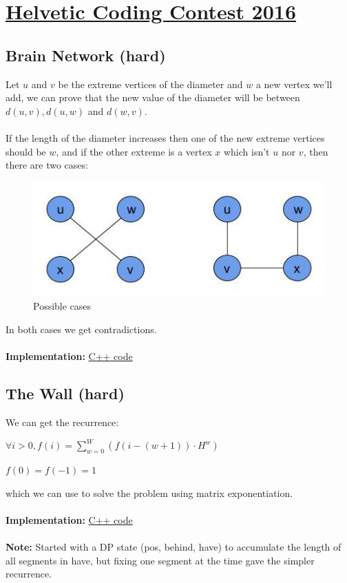 \documentclass[a4paper,12pt]{article}
\begin{document}
\section{\href{http://codeforces.com/contest/690}{Helvetic Coding Contest 2016}}

\subsection{Brain Network (hard)}

Let $u$ and $v$ be the extreme vertices of the diameter and $w$ a new vertex we'll add,
we can prove that the new value of the diameter will be between $d(u,v), d(u,w)$ and $d(w,v)$.
\\ \\
If the length of the diameter increases then one of the new extreme vertices should be $w$,
and if the other extreme is a vertex $x$ which isn't $u$ nor $v$, then there
are two cases:

\begin{figure}[!ht]
\centering
\includegraphics[scale=0.6]{img/helvetic-c.jpg}
\caption{Possible cases}
\end{figure}

In both cases we get contradictions.
\\ \\
\textbf{Implementation:} \href{http://codeforces.com/contest/690/submission/19389500}{C++ code}

\subsection{The Wall (hard)}

We can get the recurrence:

\begin{center}
$\forall i > 0, f(i) = \sum_{w = 0}^W (f(i - (w + 1)) \cdot H^w)$

$f(0) = f(-1) = 1$
\end{center}

which we can use to solve the problem using matrix exponentiation.
\\ \\
\textbf{Implementation:} \href{http://codeforces.com/contest/690/submission/19405468}{C++ code}
\\ \\
\textbf{Note:} Started with a DP state (pos, behind, have) to accumulate the length of all segments
in have, but fixing one segment at the time gave the simpler recurrence.
\end{document}

